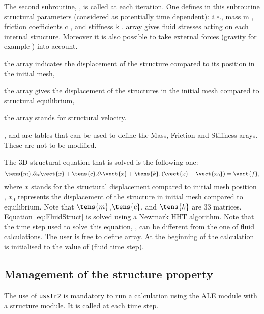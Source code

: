 {{The second subroutine, , is called at each iteration. One defines in this
 subroutine structural parameters (considered as potentially time dependent): {\em i.e.},
 mass m , friction coefficients c , and stiffness k .
  array gives fluid stresses acting on each internal structure. Moreover it is also
 possible to take external forces (gravity for example ) into account.
\begin{list}{.}{}
 \item the  array indicates the displacement of the structure compared to its position in the initial mesh,
 \item the  array gives the displacement of the structures in the initial mesh
 compared to structural equilibrium,
 \item the  array stands for structural velocity.
\end{list}
,  and  are  tables that can be used to
 define the  Mass, Friction and Stiffness arays. These are not to be modified.

The 3D structural equation that is solved is the following one:
\begin{equation}\label{eq:FluidStruct}
\displaystyle
\tens{m}.\partial_{tt}\vect{x}+\tens{c}.\partial_{t}\vect{x}+\tens{k}.\left(\vect{x}+\vect{x_0}\right)=\vect{f},
\end{equation}
where $x$ stands for the structural displacement compared to initial mesh position
 , $x_0$ represents
 the displacement of the structure in initial mesh compared to equilibrium.
Note that $\tens{m}$,$\tens{c}$, and $\tens{k}$ are 33 matrices.
Equation \eqref{eq:FluidStruct} is solved using a Newmark HHT algorithm.
Note that the time step used to solve this equation, , can be
 different from the one of fluid calculations. The user is free to define 
 array. At the beginning of the calculation  is initialised to the value of
  (fluid time step).

\subsection{Management of the structure property}

The use of \texttt{usstr2} is mandatory to run a calculation using the ALE
 module with a structure module. It is called at each time step.

}}
